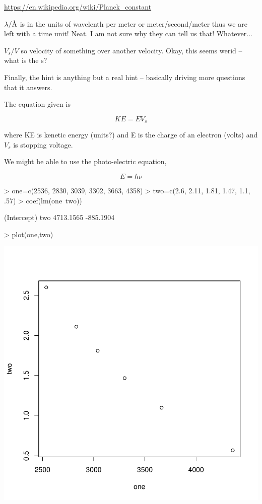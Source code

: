 \documentclass{article}
\newcommand{\angstrom}{\textup{\AA}}
\begin{document}
\url{https://en.wikipedia.org/wiki/Planck_constant}



$\lambda/\angstrom$ is in the units of wavelenth per meter or meter/second/meter thus we are left with a time unit! Neat. I am not sure why they can tell us that!  Whatever...

$V_s/V$ so velocity of something over another velocity. Okay, this seems werid -- what is the s?

Finally, the hint is anything but a real hint -- basically driving more questions that it answers. 

The equation given is 

\begin{equation}
KE = EV_s
\end{equation}

\noindent where KE is kenetic energy (units?) and E is the charge of an electron (volts) and $V_s$ is stopping voltage.

We might be able to use the photo-electric equation,

\begin{equation}
E = h\nu
\end{equation}

\begin{Schunk}
\begin{Sinput}
> one=c(2536, 2830, 3039, 3302, 3663, 4358)
> two=c(2.6, 2.11, 1.81, 1.47, 1.1, .57)
> coef(lm(one~two))
\end{Sinput}
\begin{Soutput}
(Intercept)         two 
  4713.1565   -885.1904 
\end{Soutput}
\begin{Sinput}
> plot(one,two)
\end{Sinput}
\end{Schunk}
\includegraphics{Chemistry1-003}
\end{document}
